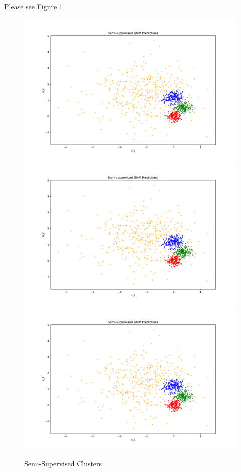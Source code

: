 \begin{answer}
    Please see Figure \ref{fig:sscluster}

\begin{figure}[htbp]
    \centering 
    \includegraphics[width=0.7\linewidth]{pics/p03_pred_ss_0.pdf}
    \includegraphics[width=0.7\linewidth]{pics/p03_pred_ss_1.pdf}
    \includegraphics[width=0.7\linewidth]{pics/p03_pred_ss_2.pdf}
    \caption{Semi-Supervised Clusters}
    \label{fig:sscluster}
\end{figure}
 \end{answer}
